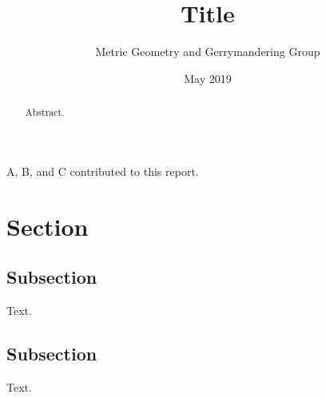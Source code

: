 \documentclass{mgggarticle}
\title{Title}
\author{Metric Geometry and Gerrymandering Group}
\date{May 2019}
\begin{document}
\begin{titlepage}

\maketitle

\begin{abstract}
Abstract.
\end{abstract}

\newpage

\tableofcontents

\begin{contributors}
A, B, and C contributed to this report.
\end{contributors}

\end{titlepage}

\section{Section}

\subsection{Subsection}

Text.

\newpage


\subsection{Subsection}

Text.
\end{document}
